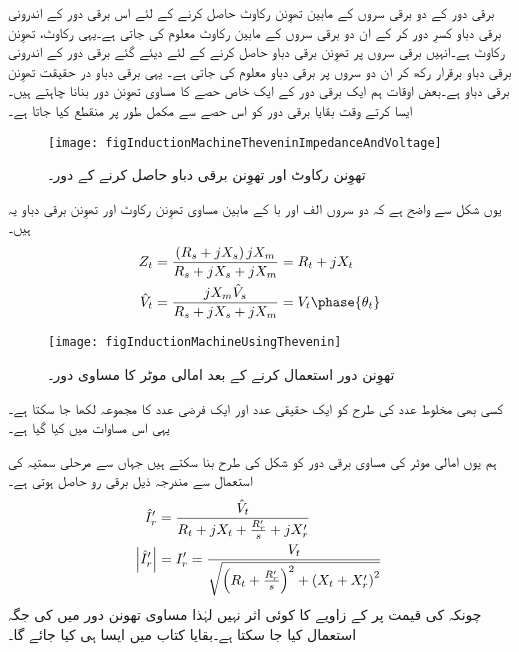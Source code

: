 برقی دور کے دو برقی سروں کے مابین تھوِنن رکاوٹ حاصل کرنے کے لئے  اس برقی دور کے اندرونی برقی دباو کسرِ دور کر کے ان دو برقی سروں کے مابین رکاوٹ معلوم کی جاتی ہے۔یہی رکاوٹ، تھوِنن رکاوٹ ہے۔انہیں برقی سروں پر تھوِنن برقی دباو حاصل کرنے کے لئے دیئے گئے برقی دور کے اندرونی برقی دباو برقرار رکھ کر ان دو سروں پر برقی دباو معلوم کی جاتی ہے۔ یہی برقی دباو در حقیقت تھوِنن برقی دباو ہے۔بعض اوقات ہم ایک برقی دور کے ایک خاص حصے کا مساوی تھوِنن دور بنانا چاہتے ہیں۔ایسا کرتے وقت بقایا برقی دور کو اس حصے سے مکمل طور پر منقطع کیا جاتا ہے۔
\begin{figure}
\centering
\texttt{[image: figInductionMachineTheveninImpedanceAndVoltage]}
\caption{تھوِنن رکاوٹ اور تھوِنن برقی دباو حاصل کرنے کے دور۔}
\label{شکل_امالی_تھونن_رکاوٹ_اور_دباو}
\end{figure}
یوں شکل   سے واضح ہے کہ دو سروں الف اور با کے مابین مساوی تھوِنن  رکاوٹ اور تھوِنن برقی دباو یہ ہیں۔
\begin{gather}
\begin{aligned}\label{مساوات_امالی_تھونن_متغرات}
Z_t&=\frac{\left(R_s+j X_s \right) j X_m}{R_s +j X_s + j X_m}=R_t+j X_t\\
\hat{V}_t&=\frac{j X_m \hat{V}_s}{R_s +j X_s + j X_m}=V_t \phase{\theta_t}
\end{aligned}
\end{gather}
%
\begin{figure}
\centering
\texttt{[image: figInductionMachineUsingThevenin]}
\caption{تھوِنن دور استعمال کرنے کے بعد امالی موٹر کا مساوی دور۔}
\label{شکل_امالی_تھونن_استعمال_کرتے_ہوئے}
\end{figure}
کسی بھی مخلوط عدد کی طرح   کو ایک حقیقی عدد  اور ایک فرضی عدد  کا مجموعہ لکھا جا سکتا ہے۔ یہی اس مساوات میں کیا گیا ہے۔

ہم یوں امالی موٹر کی مساوی برقی دور کو شکل   کی طرح بنا سکتے ہیں جہاں سے مرحلی سمتیہ کی استعمال سے مندرجہ ذیل برقی رو  حاصل ہوتی ہے۔
\begin{gather}
\begin{aligned}\label{مساوات_امالی_گھمتا_رو}
\hat{I}_r'&=\frac{\hat{V}_t}{R_t +  j X_t +\frac{R_r'}{s}+ j X_r'}\\
\abs{\hat{I}_r'}&=I_r'=\frac{V_t}{\sqrt{\left(R_t+\frac{R_r'}{s} \right)^2+\left(X_t+X_r' \right)^2}}
\end{aligned}
\end{gather}
چونکہ  کی قیمت پر  کے زاویے کا کوئی اثر نہیں لہٰذا مساوی تھونن دور میں  کی جگہ   استعمال کیا جا سکتا ہے۔بقایا کتاب میں ایسا ہی کیا جائے گا۔ 

